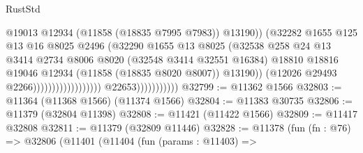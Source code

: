 \begin{lexlean}{RustStd}
\begin{coremodule}
                                                              @19013
                                                              @12934
                                                              (@11858 (@18835 @7995 @7983))
                                                              @13190))
                                                          (@32282
                                                            @1655
                                                            @125
                                                            @13
                                                            @16
                                                            @8025
                                                            @2496
                                                            (@32290
                                                              @1655
                                                              @13
                                                              @8025
                                                              (@32538
                                                                @258
                                                                @24
                                                                @13
                                                                @3414
                                                                @2734
                                                                @8006
                                                                @8020
                                                                (@32548 @3414 @32551 @16384)
                                                                @18810
                                                                @18816
                                                                @19046
                                                                @12934
                                                                (@11858 (@18835 @8020 @8007))
                                                                @13190))
                                                            (@12026 @29493 @2266))))))))))))))))))
                          @22653)))))))))))
@32799 := @11362 @1566
@32803 := @11364 (@11368 @1566) (@11374 @1566)
@32804 := @11383 @30735
@32806 := @11379 (@32804 @11398)
@32808 := @11421 (@11422 @1566)
@32809 := @11417 @32808
@32811 := @11379 (@32809 @11446)
@32828 := @11378
    (fun (fn : @76) =>
    @32806
      (@11401
        (@11404
          (fun (params : @11403) =>

\end{coremodule}
\end{lexlean}
